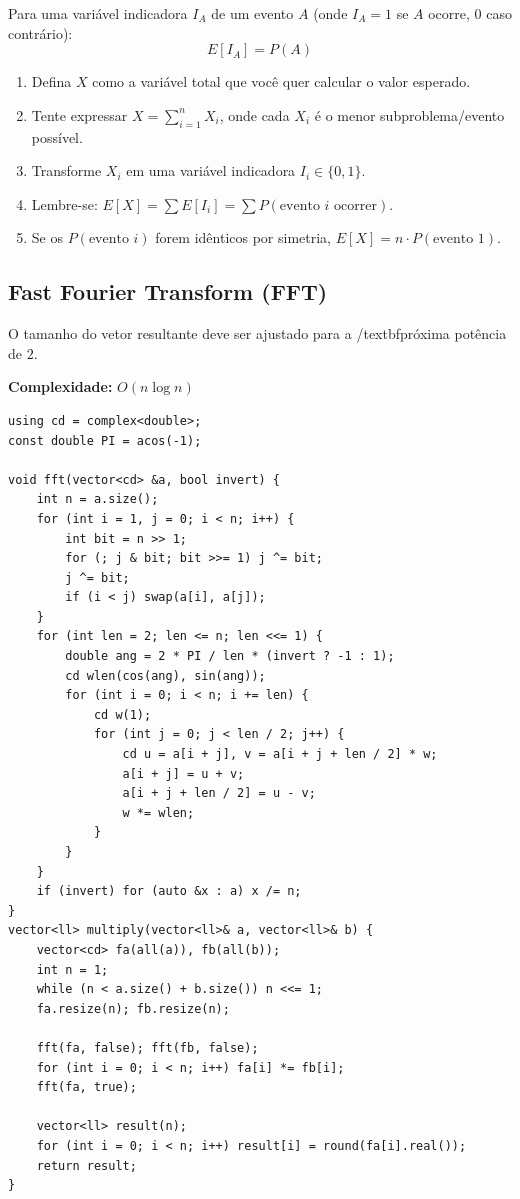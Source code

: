 Para uma variável indicadora $I_A$ de um evento $A$ (onde $I_A = 1$ se $A$ ocorre, $0$ caso contrário):
\[
E[I_A] = P(A)
\]

\begin{enumerate}
    \item Defina $X$ como a variável total que você quer calcular o valor esperado.
    \item Tente expressar $X = \sum_{i=1}^n X_i$, onde cada $X_i$ é o menor subproblema/evento possível.
    \item Transforme $X_i$ em uma variável indicadora $I_i \in \{0, 1\}$.
    \item Lembre-se: $E[X] = \sum E[I_i] = \sum P(\text{evento } i \text{ ocorrer})$.
    \item Se os $P(\text{evento } i)$ forem idênticos por simetria, $E[X] = n \cdot P(\text{evento } 1)$.
\end{enumerate}


\subsection{Fast Fourier Transform (FFT)}

O tamanho do vetor resultante deve ser ajustado para a /textbf{próxima} potência de $2$.

\textbf{Complexidade:} $O(n \log n)$

\begin{lstlisting}
using cd = complex<double>;
const double PI = acos(-1);

void fft(vector<cd> &a, bool invert) {
    int n = a.size();
    for (int i = 1, j = 0; i < n; i++) {
        int bit = n >> 1;
        for (; j & bit; bit >>= 1) j ^= bit;
        j ^= bit;
        if (i < j) swap(a[i], a[j]);
    }
    for (int len = 2; len <= n; len <<= 1) {
        double ang = 2 * PI / len * (invert ? -1 : 1);
        cd wlen(cos(ang), sin(ang));
        for (int i = 0; i < n; i += len) {
            cd w(1);
            for (int j = 0; j < len / 2; j++) {
                cd u = a[i + j], v = a[i + j + len / 2] * w;
                a[i + j] = u + v;
                a[i + j + len / 2] = u - v;
                w *= wlen; 
            }
        }
    }
    if (invert) for (auto &x : a) x /= n;
}
vector<ll> multiply(vector<ll>& a, vector<ll>& b) {
    vector<cd> fa(all(a)), fb(all(b));
    int n = 1;
    while (n < a.size() + b.size()) n <<= 1;
    fa.resize(n); fb.resize(n);
    
    fft(fa, false); fft(fb, false);
    for (int i = 0; i < n; i++) fa[i] *= fb[i];
    fft(fa, true);
    
    vector<ll> result(n);
    for (int i = 0; i < n; i++) result[i] = round(fa[i].real());
    return result;
}
\end{lstlisting}


